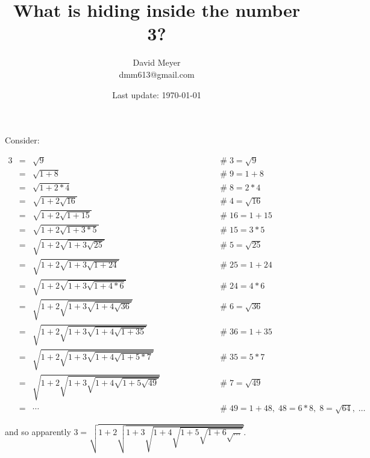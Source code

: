 \documentclass{article}
\title{What is hiding inside the number 3?}
\author{David Meyer \\ dmm613@gmail.com}
\date{Last update: \today}
\theoremstyle{definition}
\begin{document}
\maketitle

\noindent
Consider:

\begin{center}
\begin{equation*}
\begin{array}{llll}
3 
&=&  \sqrt{9}
				&\qquad \qquad \qquad \mathrel{\#} 3 = \sqrt{9} \\
[6pt]
&=&  \sqrt{1 + 8}
				&\qquad \qquad \qquad \mathrel{\#} 9 = 1 + 8 \\
[6pt]
&=&  \sqrt{1 + 2*4}
				&\qquad \qquad \qquad \mathrel{\#} 8 = 2 * 4 \\
[6pt]
&=&  \sqrt{1 + 2 \sqrt{16}}
				&\qquad \qquad \qquad \mathrel{\#} 4 = \sqrt{16}\\
[6pt]
&=&  \sqrt{1 + 2 \sqrt{1 + 15}}
				&\qquad \qquad \qquad \mathrel{\#} 16 = 1 + 15 \\
[6pt]
&=&  \sqrt{1 + 2 \sqrt{1 + 3*5}}
				&\qquad \qquad \qquad \mathrel{\#} 15 = 3 * 5 \\
[6pt]
&=&  \sqrt{1 + 2 \sqrt{1 + 3 \sqrt{25}}}
				&\qquad \qquad \qquad \mathrel{\#} 5 = \sqrt{25} \\
[6pt]
&=&  \sqrt{1 + 2 \sqrt{1 + 3 \sqrt{1 + 24}}}
				&\qquad \qquad \qquad \mathrel{\#} 25 = 1 + 24 \\
[6pt]
&=&  \sqrt{1 + 2 \sqrt{1 + 3 \sqrt{1 + 4*6}}}
				&\qquad \qquad \qquad \mathrel{\#} 24 = 4 * 6 \\
[6pt]
&=&  \sqrt{1 + 2 \sqrt{1 + 3 \sqrt{1 + 4 \sqrt{36}}}}
				&\qquad \qquad \qquad \mathrel{\#} 6 = \sqrt{36}  \\
[6pt]
&=&  \sqrt{1 + 2 \sqrt{1 + 3 \sqrt{1 + 4 \sqrt{1 + 35}}}}
				&\qquad \qquad \qquad \mathrel{\#} 36 = 1 + 35 \\
[6pt]
&=&  \sqrt{1 + 2 \sqrt{1 + 3 \sqrt{1 + 4 \sqrt{1 + 5*7}}}}
				&\qquad \qquad \qquad \mathrel{\#} 35 = 5 * 7 \\
[6pt]
&=&  \sqrt{1 + 2 \sqrt{1 + 3 \sqrt{1 + 4 \sqrt{1 + 5 \sqrt{49}}}}}
				&\qquad \qquad \qquad \mathrel{\#} 7 = \sqrt{49} \\
[6pt]
&=& \cdots
				&\qquad \qquad \qquad \mathrel{\#} 49 = 1 + 48,\; 48 = 6*8, \; 8 = \sqrt{64}, \; \hdots 
\end{array}
\end{equation*}
\end{center}

\bigskip
\noindent
and so apparently $3 = \sqrt{1 + 2 \sqrt{1 + 3 \sqrt{1 + 4  \sqrt{1 + 5 \sqrt{1 + 6 \sqrt{\hdots}}}}}}$.
\end{document}
